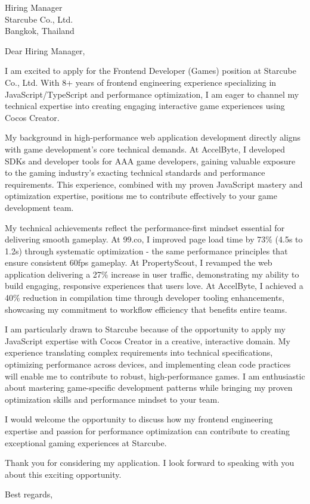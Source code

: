 \documentclass[11pt]{letter}
\begin{document}
\begin{letter}{
  Hiring Manager \\
  Starcube Co., Ltd. \\
  Bangkok, Thailand
}

\opening{Dear Hiring Manager,}

I am excited to apply for the Frontend Developer (Games) position at Starcube Co., Ltd. With 8+ years of frontend engineering experience specializing in JavaScript/TypeScript and performance optimization, I am eager to channel my technical expertise into creating engaging interactive game experiences using Cocos Creator.

My background in high-performance web application development directly aligns with game development's core technical demands. At AccelByte, I developed SDKs and developer tools for AAA game developers, gaining valuable exposure to the gaming industry's exacting technical standards and performance requirements. This experience, combined with my proven JavaScript mastery and optimization expertise, positions me to contribute effectively to your game development team.

My technical achievements reflect the performance-first mindset essential for delivering smooth gameplay. At 99.co, I improved page load time by 73\% (4.5s to 1.2s) through systematic optimization - the same performance principles that ensure consistent 60fps gameplay. At PropertyScout, I revamped the web application delivering a 27\% increase in user traffic, demonstrating my ability to build engaging, responsive experiences that users love. At AccelByte, I achieved a 40\% reduction in compilation time through developer tooling enhancements, showcasing my commitment to workflow efficiency that benefits entire teams.

I am particularly drawn to Starcube because of the opportunity to apply my JavaScript expertise with Cocos Creator in a creative, interactive domain. My experience translating complex requirements into technical specifications, optimizing performance across devices, and implementing clean code practices will enable me to contribute to robust, high-performance games. I am enthusiastic about mastering game-specific development patterns while bringing my proven optimization skills and performance mindset to your team.

I would welcome the opportunity to discuss how my frontend engineering expertise and passion for performance optimization can contribute to creating exceptional gaming experiences at Starcube.

Thank you for considering my application. I look forward to speaking with you about this exciting opportunity.

\closing{Best regards,}

\end{letter}
\end{document}
